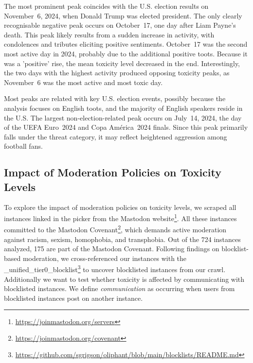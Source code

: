 The most prominent peak coincides with the U.S. election results on November~6, 2024, when Donald Trump was elected president. The only clearly recognisable negative peak occurs on October~17, one day after Liam Payne's death. This peak likely results from a sudden increase in activity, with condolences and tributes eliciting positive sentiments. October~17 was the second most active day in 2024, probably due to the additional positive toots. Because it was a 'positive' rise, the mean toxicity level decreased in the end. Interestingly, the two days with the highest activity produced opposing toxicity peaks, as November~6 was the most active and most toxic day. 

Most peaks are related with key U.S. election events, possibly because the analysis focuses on English toots, and the majority of English speakers reside in the U.S. The largest non-election-related peak occurs on July~14, 2024, the day of the UEFA Euro~2024 and Copa América~2024 finals. Since this peak primarily falls under the threat category, it may reflect heightened aggression among football fans.

\subsection{Impact of Moderation Policies on Toxicity Levels}\label{moderation:categorization}

To explore the impact of moderation policies on toxicity levels, we scraped all instances linked in the picker from the Mastodon website\footnote{\url{https://joinmastodon.org/servers}}. All these instances committed to the Mastodon Covenant\footnote{\url{https://joinmastodon.org/covenant}}, which demands active moderation against racism, sexism, homophobia, and transphobia. Out of the 724 instances analyzed, 175 are part of the Mastodon Covenant. Following \citet{bono:2024} findings on blocklist-based moderation, we cross-referenced our instances with the \_unified\_tier0\_blocklist\footnote{\url{https://github.com/sgrigson/oliphant/blob/main/blocklists/README.md}} to uncover blocklisted instances from our crawl. Additionally we want to test whether toxicity is affected by communicating with blocklisted instances. We define \emph{communication} as occurring when users from blocklisted instances post on another instance.

